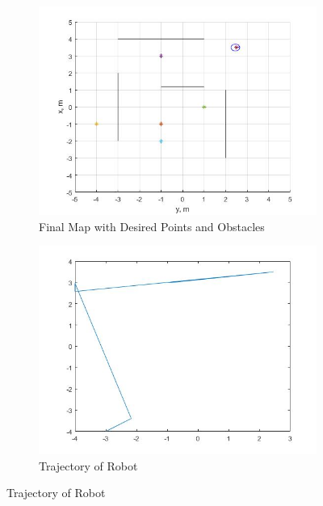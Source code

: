 \documentclass{l4proj}
\begin{document}
\begin{figure}[htb]
    \centering
    \begin{subfigure}{0.45\textwidth}
        \includegraphics[width=\textwidth]{images/Robot.jpg}
        \caption{Final Map with Desired Points and Obstacles}
        \label{fig:syn1}
    \end{subfigure}
    \begin{subfigure}{0.45\textwidth}
        \includegraphics[width=\textwidth]{images/xy.jpg}
        \caption{Trajectory of Robot}
        \label{fig:syn2}
    \end{subfigure} 
\end{figure}
\end{document}
